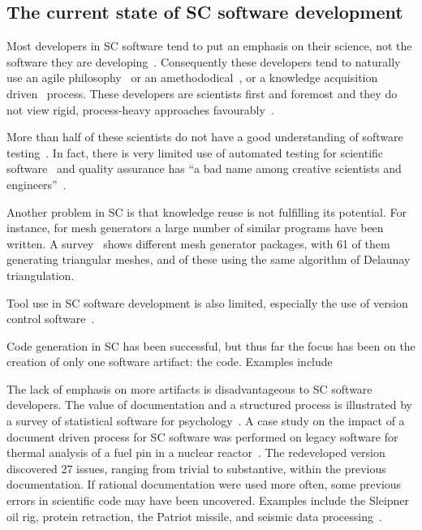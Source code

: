 \documentclass[preprint, 10pt]{sigplanconf}
\begin{document}
\subsection{The current state of SC software development}
\label{subsec:scdev}

Most developers in SC software tend to put an emphasis on their science, not the
software they are developing~\cite{Kelly}. %
Consequently these developers tend to naturally use an agile
philosophy~\cite{AckroydEtAl2008, CarverEtAl2007, EasterbrookAndJohns2009,
Segal2005} or an amethododical~\cite{Kelly2013}, or a knowledge acquisition
driven~\cite{Kelly2015} process. These developers are scientists first and
foremost and they do not view rigid, process-heavy approaches
favourably~\cite{CarverEtAl2007}.

More than half of these scientists do not have a good understanding of software
testing~\cite{Merali2010}. In fact, there is very limited use of automated
testing for scientific software~\cite{PatrickAndGilligan2016} and quality
assurance has ``a bad name among creative scientists and
engineers''~\cite[p.~352]{Roache1998}.

Another problem in SC is that knowledge reuse is not fulfilling its potential.
For instance, for mesh generators a large number of similar programs have been
written. A survey~\cite{Owen1998} shows %
different mesh generator packages,
with 61 of them generating triangular meshes, and %
of these using the same algorithm of Delaunay triangulation.

Tool use in SC software development is also limited, especially the use of
version control software~\cite{Wilson2006}.

Code generation in SC has been successful, but thus far the focus has been on
the creation of only one software artifact: the code. Examples include

The lack of emphasis on more artifacts is disadvantageous to SC software
developers. The value of documentation and a structured process is illustrated
by a survey of statistical software for
psychology~\cite{SmithEtAl2015-SS-TR,SmithEtAl2015SQJ}. A case study on the
impact of a document driven process for SC software was performed on legacy
software for thermal analysis of a fuel pin in a nuclear
reactor~\cite{SmithAndKoothoor2016, SmithEtAl2013}. The redeveloped version
discovered 27 issues, ranging from trivial to substantive, within the previous
documentation. If rational documentation were used more often, some previous
errors in scientific code may have been uncovered. Examples include the Sleipner
oil rig, protein retraction, the Patriot missile, and seismic data
processing~\cite{HattonAndRoberts1994}.
\end{document}
